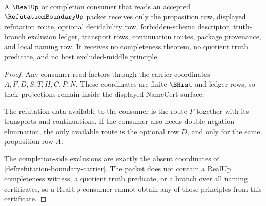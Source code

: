 \begin{theorem}
\label{thm:refutation-boundary-realup-consumer-scope}
A $\RealUp$ or completion consumer that reads an accepted $\RefutationBoundaryUp$ packet receives only the proposition row, displayed refutation route, optional decidability row, forbidden-schema descriptor, truth-branch exclusion ledger, transport rows, continuation routes, package provenance, and local naming row. It receives no completeness theorem, no quotient truth predicate, and no host excluded-middle principle.
\end{theorem}
\begin{proof}
Any consumer read factors through the carrier coordinates $A,F,D,S,T,H,C,P,N$. These coordinates are finite $\BHist$ and ledger rows, so their projections remain inside the displayed NameCert surface.

The refutation data available to the consumer is the route $F$ together with its transports and continuations. If the consumer also needs double-negation elimination, the only available route is the optional row $D$, and only for the same proposition row $A$.

The completion-side exclusions are exactly the absent coordinates of \autoref{def:refutation-boundary-carrier}. The packet does not contain a RealUp completeness witness, a quotient truth predicate, or a branch over all naming certificates, so a RealUp consumer cannot obtain any of those principles from this certificate.
\end{proof}


